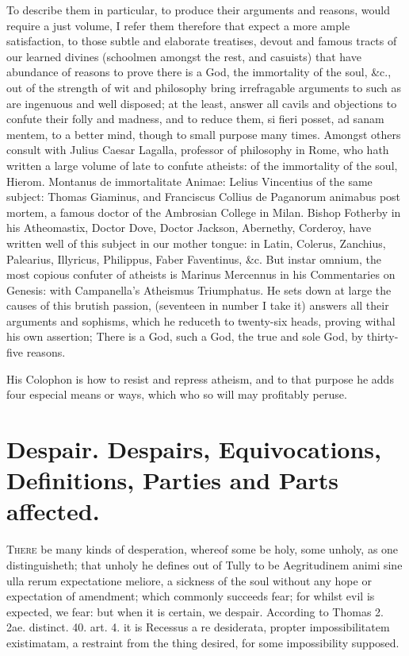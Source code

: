 {To describe them in particular, to produce their arguments and reasons,
would require a just volume, I refer them therefore that expect a more
ample satisfaction, to those subtle and elaborate treatises, devout and
famous tracts of our learned divines (schoolmen amongst the rest, and
casuists) that have abundance of reasons to prove there is a God, the
immortality of the soul, \&c., out of the strength of wit and philosophy
bring irrefragable arguments to such as are ingenuous and well
disposed; at the least, answer all cavils and objections to confute
their folly and madness, and to reduce them, si fieri posset, ad sanam
mentem, to a better mind, though to small purpose many times. Amongst
others consult with Julius Caesar Lagalla, professor of philosophy in
Rome, who hath written a large volume of late to confute atheists: of
the immortality of the soul, Hierom. Montanus de immortalitate Animae:
Lelius Vincentius of the same subject: Thomas Giaminus, and Franciscus
Collius de Paganorum animabus post mortem, a famous doctor of the
Ambrosian College in Milan. Bishop Fotherby in his Atheomastix, Doctor
Dove, Doctor Jackson, Abernethy, Corderoy, have written well of this
subject in our mother tongue: in Latin, Colerus, Zanchius, Palearius,
Illyricus, Philippus, Faber Faventinus, \&c. But instar omnium,
the most copious confuter of atheists is Marinus Mercennus in his
Commentaries on Genesis: with Campanella's Atheismus Triumphatus.
He sets down at large the causes of this brutish passion, (seventeen in
number I take it) answers all their arguments and sophisms, which he
reduceth to twenty-six heads, proving withal his own assertion; There
is a God, such a God, the true and sole God, by thirty-five reasons.

His Colophon is how to resist and repress atheism, and to that purpose
he adds four especial means or ways, which who so will may profitably
peruse.

\section[Despair]{Despair. Despairs, Equivocations, Definitions, Parties and Parts affected.}

\lettrine{T}{here} be many kinds of desperation, whereof some be holy, some unholy,
as one distinguisheth; that unholy he defines out of Tully to be
Aegritudinem animi sine ulla rerum expectatione meliore, a sickness of
the soul without any hope or expectation of amendment; which commonly
succeeds fear; for whilst evil is expected, we fear: but when it is
certain, we despair. According to Thomas 2. 2ae. distinct. 40. art. 4.
it is Recessus a re desiderata, propter impossibilitatem existimatam, a
restraint from the thing desired, for some impossibility supposed.

}
